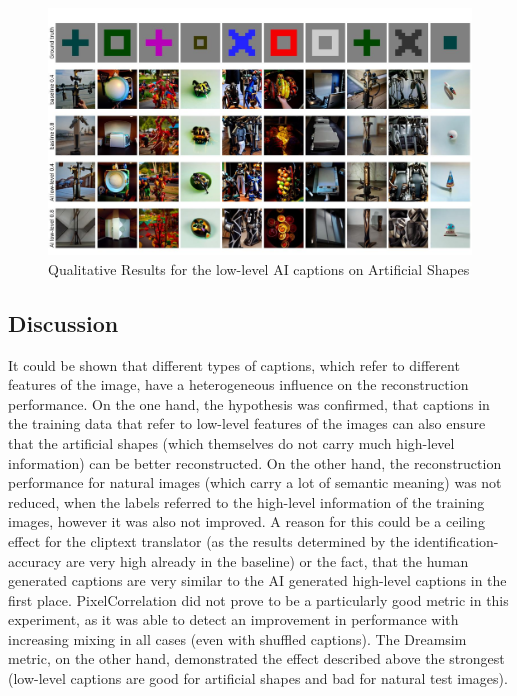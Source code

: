 \begin{figure}[ht]
    \centering
    \includegraphics[width=1\textwidth]{plots/aicap_qual_art.JPEG}
    \caption{Qualitative Results for the low-level AI captions on Artificial Shapes}\label{fig:aicap_qual_art}
\end{figure}

\subsection{Discussion}

It could be shown that different types of captions, which refer to different features of the image, have a heterogeneous influence on the reconstruction performance. On the one hand, the hypothesis was confirmed, that captions in the training data that refer to low-level features of the images can also ensure that the artificial shapes (which themselves do not carry much high-level information) can be better reconstructed. On the other hand, the reconstruction performance for natural images (which carry a lot of semantic meaning) was not reduced,  when the labels referred to the high-level information of the training images, however it was also not improved. A reason for this could be a ceiling effect for the cliptext translator (as the results determined by the identification-accuracy are very high already in the baseline) or the fact, that the human generated captions are very similar to the AI generated high-level captions in the first place. PixelCorrelation did not prove to be a particularly good metric in this experiment, as it was able to detect an improvement in performance with increasing mixing in all cases (even with shuffled captions). The Dreamsim metric, on the other hand,  demonstrated the effect described above the strongest (low-level captions are good for artificial shapes and bad for natural test images). 

